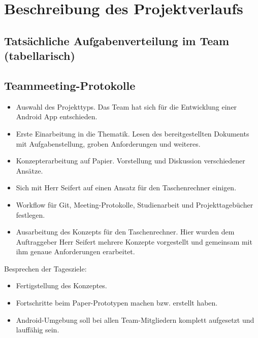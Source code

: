 \section{Beschreibung des Projektverlaufs}

\subsection{Tatsächliche Aufgabenverteilung im Team (tabellarisch)}

\subsection{Teammeeting-Protokolle}


\begin{itemize}
	\item Auswahl des Projekttyps. Das Team hat sich für die Entwicklung einer Android  App entschieden.
	\item Erste Einarbeitung in die Thematik. Lesen des bereitgestellten Dokuments mit Aufgabenstellung, groben Anforderungen und weiteres.
	\item Konzepterarbeitung auf Papier. Vorstellung und Diskussion verschiedener Ansätze.
\end{itemize}


\begin{itemize}
	\item Sich mit Herr Seifert auf einen Ansatz für den Taschenrechner einigen.
	\item Workflow für Git, Meeting-Protokolle, Studienarbeit und Projekttagebücher festlegen.
	\item Ausarbeitung des Konzepts für den Taschenrechner. Hier wurden dem Auftraggeber Herr Seifert mehrere Konzepte vorgestellt und gemeinsam mit ihm genaue Anforderungen erarbeitet.
\end{itemize}


Besprechen der Tagesziele:

\begin{itemize}
	\item Fertigstellung des Konzeptes.
	\item Fortschritte beim Paper-Prototypen machen bzw. erstellt haben.
	\item Android-Umgebung soll bei allen Team-Mitgliedern komplett aufgesetzt und lauffähig sein.
\end{itemize}

